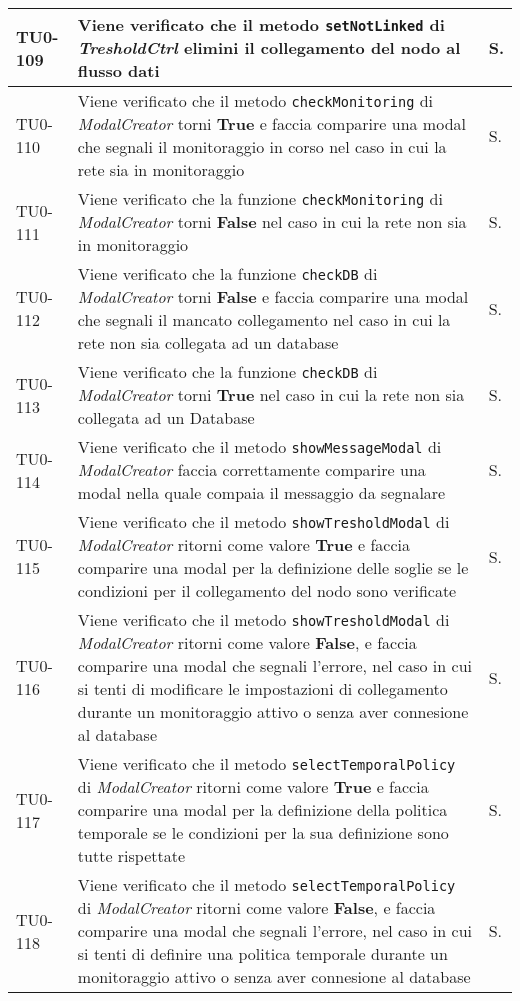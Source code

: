 \begin{longtable}{|C{.15\textwidth}|m{.66\textwidth}|C{.10\textwidth}|}
\hline
TU0-109 & Viene verificato che il metodo \texttt{setNotLinked} di \textit{TresholdCtrl} elimini il collegamento del nodo al flusso dati & S.\\
\hline
{}TU0-110 & Viene verificato che il metodo \texttt{checkMonitoring} di \textit{ModalCreator} torni \textbf{True} e faccia comparire una modal che segnali il monitoraggio in corso nel caso in cui la rete sia in monitoraggio & S. \\
\hline
TU0-111 & Viene verificato che la funzione \texttt{checkMonitoring} di \textit{ModalCreator} torni \textbf{False} nel caso in cui la rete non sia in monitoraggio & S. \\
\hline
{}TU0-112 & Viene verificato che la funzione \texttt{checkDB} di \textit{ModalCreator} torni \textbf{False} e faccia comparire una modal che segnali il mancato collegamento nel caso in cui la rete non sia collegata ad un database & S. \\
\hline
TU0-113 & Viene verificato che la funzione \texttt{checkDB} di \textit{ModalCreator} torni \textbf{True} nel caso in cui la rete non sia collegata ad un Database & S. \\
\hline
{}TU0-114 & Viene verificato che il metodo \texttt{showMessageModal} di \textit{ModalCreator} faccia correttamente comparire una modal nella quale compaia il messaggio da segnalare & S. \\
\hline
TU0-115 & Viene verificato che il metodo \texttt{showTresholdModal} di \textit{ModalCreator} ritorni come valore \textbf{True} e faccia comparire una modal per la definizione delle soglie se le condizioni per il collegamento del nodo sono verificate & S. \\
\hline
{}TU0-116 & Viene verificato che il metodo \texttt{showTresholdModal} di \textit{ModalCreator} ritorni come valore \textbf{False}, e faccia comparire una modal che segnali l'errore, nel caso in cui si tenti di modificare le impostazioni di collegamento durante un monitoraggio attivo o senza aver connesione al database  & S. \\
\hline
TU0-117 & Viene verificato che il metodo \texttt{selectTemporalPolicy} di \textit{ModalCreator} ritorni come valore \textbf{True} e faccia comparire una modal per la definizione della politica temporale se le condizioni per la sua definizione sono tutte rispettate & S. \\
\hline
{}TU0-118 & Viene verificato che il metodo \texttt{selectTemporalPolicy} di \textit{ModalCreator} ritorni come valore \textbf{False}, e faccia comparire una modal che segnali l'errore, nel caso in cui si tenti di definire una politica temporale durante un monitoraggio attivo o senza aver connesione al database & S. \\

\end{longtable}
